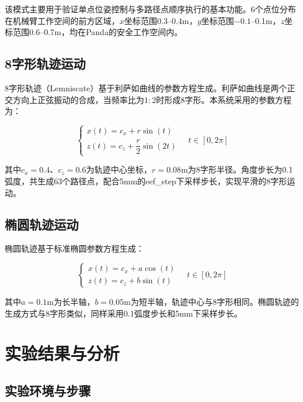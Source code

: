 \documentclass[a4paper,12pt]{ctexart}
\newcommand{\bodytext}{\fontsize{12pt}{20pt}\selectfont\setlength{\parskip}{0pt}}
\begin{document}
该模式主要用于验证单点位姿控制与多路径点顺序执行的基本功能。6个点位分布在机械臂工作空间的前方区域，$x$坐标范围0.3--0.4m，$y$坐标范围$-0.1$--0.1m，$z$坐标范围0.6--0.7m，均在Panda的安全工作空间内。

\subsection{8字形轨迹运动}

\bodytext

8字形轨迹（Lemniscate）基于利萨如曲线的参数方程生成。利萨如曲线是两个正交方向上正弦振动的合成，当频率比为$1:2$时形成8字形。本系统采用的参数方程为：

\begin{equation}
\label{eq:eight}
\begin{cases}
x(t) = c_x + r \sin(t) \\
z(t) = c_z + \dfrac{r}{2} \sin(2t)
\end{cases}
\quad t \in [0, 2\pi]
\end{equation}

其中$c_x = 0.4$、$c_z = 0.6$为轨迹中心坐标，$r = 0.08$m为8字形半径。角度步长为0.1弧度，共生成63个路径点，配合5mm的eef\_step下采样步长，实现平滑的8字形运动。

\subsection{椭圆轨迹运动}

\bodytext

椭圆轨迹基于标准椭圆参数方程生成：

\begin{equation}
\label{eq:ellipse}
\begin{cases}
x(t) = c_x + a \cos(t) \\
z(t) = c_z + b \sin(t)
\end{cases}
\quad t \in [0, 2\pi]
\end{equation}

其中$a = 0.1$m为长半轴，$b = 0.05$m为短半轴，轨迹中心与8字形相同。椭圆轨迹的生成方式与8字形类似，同样采用0.1弧度步长和5mm下采样步长。

\section{实验结果与分析}

\subsection{实验环境与步骤}
\end{document}
